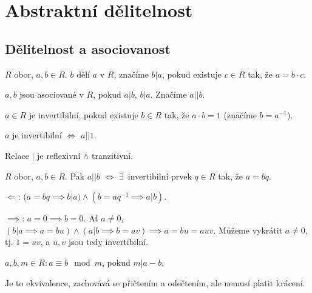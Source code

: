 \documentclass[12pt]{article}                   %
\begin{document}
\section{Abstraktní dělitelnost}
    \subsection{Dělitelnost a asociovanost}
        \begin{definice}
            $R$ obor, $a, b \in R$. $b$ dělí $a$ v $R$, značíme $b|a$, pokud existuje $c \in R$ tak, že $a = b·c$.

            $a, b$ jsou asociované v $R$, pokud $a|b$, $b|a$. Značíme $a||b$.

            $a \in R$ je invertibilní, pokud existuje $b \in R$ tak, že $a·b = 1$ (značíme $b = a^{-1}$).
        \end{definice}

        \begin{pozorovani}
            $a$ je invertibilní $\Leftrightarrow$ $a || 1$.

            Relace $|$ je reflexivní $\land$ tranzitivní.
        \end{pozorovani}

        \begin{tvrzeni}
            $R$ obor, $a, b \in R$. Pak $a||b$ $\Leftrightarrow$ $\exists$~invertibilní prvek $q \in R$ tak, že $a = bq$.

            \begin{dukazin}
                $\Leftarrow$: ($a = bq \implies b | a) \land (b = aq^{-1} \implies a | b)$.

                $\implies$: $a = 0 \implies b = 0$. Ať $a ≠ 0$, $(b|a \implies a = bu) \land (a|b \implies b=av) \implies a = bu = auv$. Můžeme vykrátit $a ≠ 0$, tj. $1 = uv$, a $u, v$ jsou tedy invertibilní.
            \end{dukazin}
        \end{tvrzeni}

        \begin{definice}[Kongruence]
            $a, b, m \in R: a≡b \mod m$, pokud $m | a - b$.
        \end{definice}

        \begin{pozorovani}
            Je to ekvivalence, zachovává se přičtením a odečtením, ale nemusí platit krácení.
        \end{pozorovani}
\end{document}

